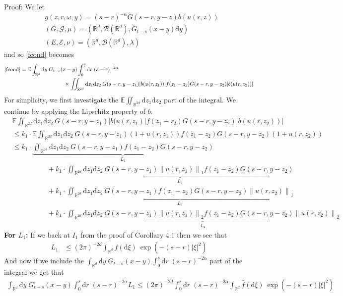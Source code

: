 \documentclass{article}
\numberwithin{equation}{section}
\newcommand{\R}{\mathbb{R}}
\newcommand{\E}{\mathbb{E}}
\newcommand{\Norm}[1]{\left\|  #1   \right\|}
\newcommand{\ud}{\ensuremath{\mathrm{d}}}
\begin{document}
Proof: We let 
\begin{align*}
&g(z,r,\omega,y)=(s-r)^{-\alpha}G(s-r,y-z)b(u(r,z))
\\& (G,\mathscr G, \mu)=(\R^d,\mathscr B(\R^d),G_{t-s}(x-y) \ud y)
\\& (E, \mathscr E, \nu) = (\R^d, \mathscr B(\R^d), \lambda)
\end{align*}
and so \eqref{fcond} becomes 
\begin{align*}
\eqref{fcond} &= \E  \int_{\R^d}\ud y \;G_{t-s}(x-y)\int_0^s\ud r\; (s-r)^{-2\alpha}
\\&\hspace{8em} \times \iint_{\R^{2d}}\ud z_1 \ud z_2 \:G(s-r,y-z_1)|b(u(r,z_1))|f(z_1-z_2)G(s-r,y-z_2)|b(u(r,z_2))| 
\end{align*}
For simplicity, we first investigate the $\E\iint_{\R^{2d}} \ud z_1 \ud z_2$ part of the integral. We continue by applying the Lipschitz property of $b$. 
\begin{align*}
&\E\iint_{\R^{2d}}\ud z_1 \ud z_2 \:G(s-r,y-z_1)|b(u(r,z_1)|f(z_1-z_2)G(s-r,y-z_2)|b(u(r,z_2))| 
\\ & \le k_1\cdot  \E\iint_{\R^{2d}}\ud z_1 \ud z_2 \:G(s-r,y-z_1)(1+u(r,z_1))f(z_1-z_2)G(s-r,y-z_2)(1+u(r,z_2)) 
\\ &\le k_1\cdot \underbrace{\iint_{\R^{2d}}\ud z_1 \ud z_2 \:G(s-r,y-z_1)f(z_1-z_2)G(s-r,y-z_2)}_{L_1}
\\&\hspace{5em}+k_1\cdot \underbrace{\iint_{\R^{2d}}\ud z_1 \ud z_2 \:G(s-r,y-z_1)\Norm{u(r,z_1)}_1f(z_1-z_2)G(s-r,y-z_2)}_{L_2} 
\\&\hspace{5em}+k_1\cdot \underbrace{\iint_{\R^{2d}}\ud z_1 \ud z_2 \:G(s-r,y-z_1)f(z_1-z_2)G(s-r,y-z_2)\Norm{u(r,z_2)}_1}_{L_3}
\\& \hspace{5em}+k_1\cdot \underbrace{\iint_{\R^{2d}}\ud z_1 \ud z_2 \:G(s-r,y-z_1)\Norm{u(r,z_1)}_2f(z_1-z_2)G(s-r,y-z_2)\Norm{u(r,z_2)}_2}_{L_4} 
\end{align*}
\textbf{For $L_1$:} If we back at $I_1$ from the proof of Corollary 4.1 then we see that 
\begin{align*}
L_1 &\le (2\pi)^{-2d}\int_{\R^d}\hat f (\ud \xi)\: \exp(-(s-r)|\xi|^2)
\end{align*}
And now if we include the $\int_{\R^d}\ud y \;G_{t-s}(x-y)\int_0^s\ud r\; (s-r)^{-2\alpha}$ part of the integral we get that 
\begin{align*}
\int_{\R^d}\ud y \;G_{t-s}(x-y)\int_0^s\ud r\; (s-r)^{-2\alpha} L_1 \le (2\pi)^{-2d} \int_0^s\ud r\; (s-r)^{-2\alpha}\int_{\R^d}\hat f (\ud \xi)\: \exp(-(s-r)|\xi|^2)
\end{align*}
\end{document}
